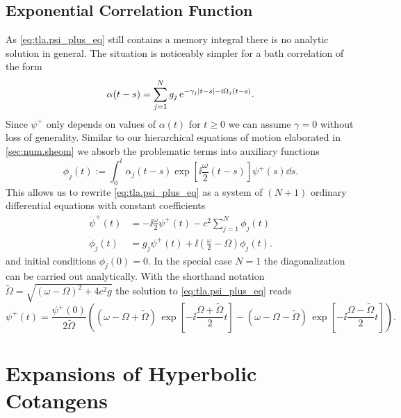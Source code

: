 \section{Exponential Correlation Function}
\label{sec:tla.exp}

As \autoref{eq:tla.psi_plus_eq} still contains a memory integral there is no analytic solution in general.
The situation is noticeably simpler for a bath correlation of the form
\begin{equation}
  \alpha(t - s) = \sum_{j=1}^N g_j \, \exp[-\gamma_j \abs{t - s} - \ii \Omega_j (t - s)].
  \label{eq:tla.exp_alpha}
\end{equation}
Since $\psi^+$ only depends on values of $\alpha(t)$ for $t \ge 0$ we can assume $\gamma = 0$ without loss of generality.
Similar to our hierarchical equations of motion elaborated in \autoref{sec:num.sheom} we absorb the problematic terms into auxiliary functions
\begin{equation}
  \phi_j(t) := \int_0^t \alpha_j(t-s) \exp[\ii \frac{\omega}{2}(t-s)] \psi^+(s) \dd s.
  \label{eq:tla.auxiliary}
\end{equation}
This allows us to rewrite \autoref{eq:tla.psi_plus_eq} as a system of $(N+1)$ ordinary differential equations with constant coefficients
\begin{align*}
  \dot\psi^+(t) &= -\ii \frac{\omega}{2} \psi^+(t) - c^2 \sum_{j=1}^N \phi_j(t) \\
  \dot\phi_j(t) &= g_j \psi^+(t) + \ii \left( \frac{\omega}{2} - \Omega \right) \phi_j(t).
\end{align*}
and initial conditions $\phi_j(0) = 0$.
In the special case $N = 1$ the diagonalization can be carried out analytically.
With the shorthand notation $\tilde\Omega = \sqrt{(\omega - \Omega)^2 + 4c^2 g}$ the solution to \autoref{eq:tla.psi_plus_eq} reads
\begin{equation}
  \psi^+(t) = \frac{\psi^+(0)}{2\tilde\Omega} \left( (\omega - \Omega + \tilde\Omega) \, \exp[-\ii \frac{\Omega + \tilde\Omega}{2} t ]  -  (\omega - \Omega - \tilde\Omega) \, \exp[-\ii \frac{\Omega - \tilde\Omega}{2} t ] \right).
  \label{eq:tla.solution}
\end{equation}

%

\chapter{Expansions of Hyperbolic Cotangens}
\label{cha:coth}
%


